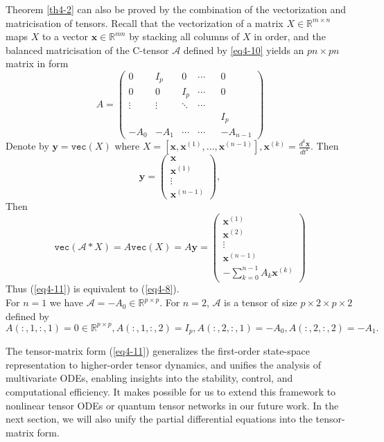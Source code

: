 \documentclass[11pt, oneside]{article}  %
\newcommand{\vecc}{\texttt{vec}}
\newcommand{\RR}{\mathbb{R}}
\newcommand{\A}{\mathcal{A}}
\newcommand{\bx}{\textbf{x}}
\newcommand{\by}{\textbf{y}}
\newcommand{\beq}{\begin{equation}}
\newcommand{\eeq}{\end{equation}}
\begin{document}
Theorem \ref{th4-2} can also be proved by the combination of the vectorization and matricisation of tensors. Recall that the vectorization 
of a matrix $X\in\RR^{m\times n}$ maps $X$ to a vector $\bx\in\RR^{mn}$ by stacking all columns of $X$ in order, and the balanced matricisation 
of the C-tensor $\A$ defined by \eqref{eq4-10} yields an $pn\times pn$ matrix in form 
\beq\label{eq4-12}
A = \begin{pmatrix} 
         0 & I_{p}  &        0 & \cdots & & 0\\
         0 &        0  & I_{p} & \cdots & & 0\\
 \vdots & \vdots & \ddots & \cdots & &   \\
            &            &           &            &  &I_{p}\\
  -A_{0}&-A_{1}&\cdots &\cdots&   &-A_{n-1}  
\end{pmatrix}
\eeq
Denote by $\by=\vecc(X)$ where $X=[\bx,\bx^{(1)},\ldots, \bx^{(n-1)}], \bx^{(k)}=\frac{d^{k}\bx}{dt^{k}}$. Then 
\[
\by=\begin{pmatrix} \bx\\  \bx^{(1)}\\ \vdots \\ \bx^{(n-1)}\end{pmatrix},
\]
Then 
\[
 \vecc(\A\ast X) = A\vecc(X) =A\by = 
 \begin{pmatrix} \bx^{(1)}\\  \bx^{(2)}\\ \vdots \\ \bx^{(n-1)}\\ -\sum_{k=0}^{n-1} A_{k}\bx^{(k)}\end{pmatrix}
\]
Thus (\ref{eq4-11}) is equivalent to (\ref{eq4-8}). \\

For $n=1$ we have $\A=-A_{0}\in\RR^{p\times p}$.  For $n=2$, $\A$ is a tensor of size $p\times 2\times p\times 2$ defined by 
\[ A(:,1,:,1) =0\in\RR^{p\times p},  A(:,1,:,2) =I_{p}, A(:,2,:,1) =-A_{0},  A(:,2,:,2) =-A_{1}. \]    

The tensor-matrix form (\ref{eq4-11}) generalizes the first-order state-space representation to higher-order tensor dynamics, and unifies the analysis of multivariate ODEs, enabling insights into the stability, control, and computational efficiency. It makes possible for us to extend this framework to nonlinear tensor ODEs or quantum tensor networks in our future work. In the next section, we will also unify the partial differential equations into the tensor-matrix form. \\
 
\end{document}
